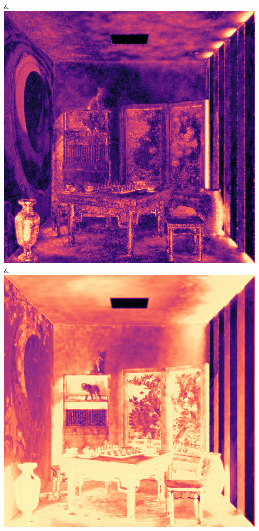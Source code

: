 & \includegraphics[width=\linewidth]{figures/py/tests/quality_comparison/nrc+bt_1spp_chess_flip.png}
& \includegraphics[width=\linewidth]{figures/py/tests/quality_comparison/nrc+lt_1spp_chess_flip.png}
